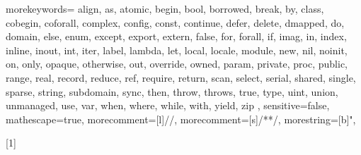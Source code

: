   {
    morekeywords={
      align, as, atomic,
      begin, bool, borrowed, break, by,
      class, cobegin, coforall, complex, config, const, continue,
      defer, delete, dmapped, do, domain,
      else, enum, except, export, extern,
      false, for, forall,
      if, imag, in, index, inline, inout, int, iter,
      label, lambda, let, local, locale,
      module,
      new, nil, noinit,
      on, only, opaque, otherwise, out, override, owned,
      param, private, proc, public,
      range, real, record, reduce, ref, require, return,
      scan, select, serial, shared, single, sparse, string, subdomain, sync,
      then, throw, throws, true, type,
      uint, union, unmanaged, use,
      var,
      when, where, while, with,
      yield,
      zip
    },
    sensitive=false,
    mathescape=true,
    morecomment=[l]{//},
    morecomment=[s]{/*}{*/},
    morestring=[b]",
}


\newcommand{\chpl}[1]{\lstinline[language=chapel,basicstyle=\small\ttfamily,keywordstyle=]!#1!}
\newcommand{\varname}[1]{\emph{#1}}
\newcommand{\typename}[1]{\emph{#1}}
\newcommand{\fnname}[1]{\chpl{#1}}




[1]
  {\lstset{language=chapel,xleftmargin=2pc,stepnumber=0,keywordstyle=}}{}



\newenvironment{protobody}{\begin{description}\item[\quad\quad] }{\end{description}}
